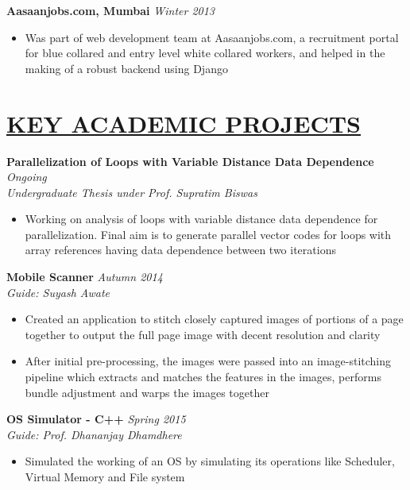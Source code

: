 \documentclass[11pt]{res}
\begin{document}
\begin{resume}
\vspace{-10pt}
\textbf{Aasaanjobs.com, Mumbai} \hfill \emph{Winter 2013}
 \begin{itemize} \itemsep -2pt
\item Was part of web development team at Aasaanjobs.com, a recruitment portal for blue collared and entry level white collared workers, and helped in the making of a robust backend using Django

\end{itemize} 

\vspace{-10pt}
\section{\underline{KEY ACADEMIC PROJECTS}} 
\vspace{3pt}

\textbf{Parallelization of Loops with Variable Distance Data Dependence} \hfill \emph{Ongoing}\\
\textsl{Undergraduate Thesis under Prof. Supratim Biswas}\hfill
\begin{itemize} \itemsep -2pt
\item Working on analysis of loops with variable distance data dependence for parallelization. Final aim is to generate parallel vector codes for loops with array references having data dependence between two iterations 
\end{itemize}

\vspace{-10pt}
\textbf{Mobile Scanner} \hfill \emph{Autumn 2014}\\
\textsl{Guide: Suyash Awate}\hfill
\begin{itemize} \itemsep -2pt
\item Created an application to stitch closely captured images of portions of a page together to output the full page image with decent resolution and clarity
\item After initial pre-processing, the images were passed into an image-stitching pipeline which extracts and matches the features in the images, performs bundle adjustment and warps the images together 
\end{itemize}

\vspace{-10pt}
\textbf{OS Simulator - C++ } \hfill \emph{Spring 2015}\\
\textsl{Guide: Prof. Dhananjay Dhamdhere}\hfill
\begin{itemize} \itemsep -2pt
\item Simulated the working of an OS by simulating its operations like Scheduler, Virtual Memory and File system
\end{itemize}


\end{resume}
\end{document}
